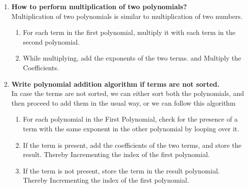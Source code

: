 \documentclass[11pt]{article}
\begin{document}
\begin{enumerate}
\begin{lstlisting}[language=C]
	\end{lstlisting}

	\item \textbf {How to perform multiplication of two polynomials?}\\

	      Multiplication of two polynomials is similar to multiplication of two numbers.
	      \begin{enumerate}
		      \item For each term in the first polynomial, multiply it with each term in the second polynomial.
		      \item While multiplying, add the exponents of the two terms. and Multiply the Coefficients.
	      \end{enumerate}

	\item \textbf { Write polynomial addition algorithm if terms are not sorted.}\\

	      In case the terms are not sorted, we can either sort both the polynomials, and then proceed to add them in the usual way, or we can follow this algorithm

	      \begin{enumerate}
		      \item For each polynomial in the First Polynomial, check for the presence of a term with the same exponent in the other polynomial by looping over it.
		      \item If the term is present, add the coefficients of the two terms, and store the result. Thereby Incrementing the index of the first polynomial.
		      \item If the term is not present, store the term in the result polynomial. Thereby Incrementing the index of the first polynomial.
	      \end{enumerate}


\end{enumerate}
\end{document}
